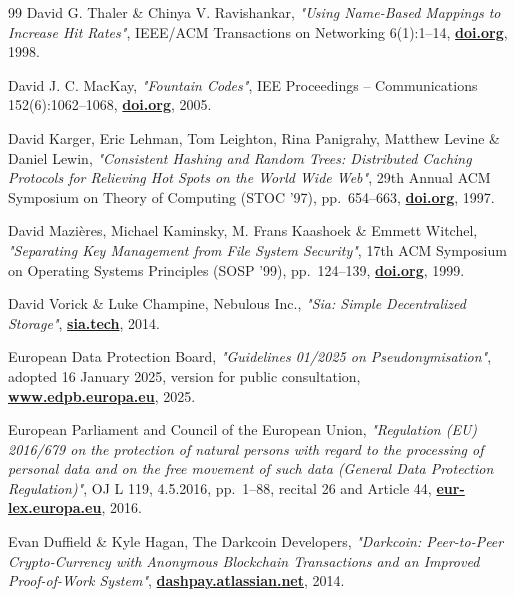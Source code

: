 \documentclass[10pt,a4paper,final]{article}
\let\oldhref\href
\renewcommand{\href}[2]{\oldhref{#1}{\bfseries#2}}
\begin{document}
\begin{thebibliography}{99}
	David G. Thaler \& Chinya V. Ravishankar,
	\emph{"Using Name-Based Mappings to Increase Hit Rates"},
	IEEE/ACM Transactions on Networking 6(1):1--14,
	\href{https://doi.org/10.1109/90.663936}{doi.org},
	1998.

	David J. C. MacKay,
	\emph{"Fountain Codes"},
	IEE Proceedings -- Communications 152(6):1062--1068,
	\href{https://doi.org/10.1049/ip-com:20050237}{doi.org},
	2005.

	David Karger, Eric Lehman, Tom Leighton, Rina Panigrahy, Matthew Levine \& Daniel Lewin,
	\emph{"Consistent Hashing and Random Trees: Distributed Caching Protocols for Relieving Hot Spots on the World Wide Web"},
	29th Annual ACM Symposium on Theory of Computing (STOC '97), pp.~654--663,
	\href{https://doi.org/10.1145/258533.258660}{doi.org},
	1997.

	David Mazi\`{e}res, Michael Kaminsky, M. Frans Kaashoek \& Emmett Witchel,
	\emph{"Separating Key Management from File System Security"},
	17th ACM Symposium on Operating Systems Principles (SOSP '99), pp.~124--139,
	\href{https://doi.org/10.1145/319151.319160}{doi.org},
	1999.

	David Vorick \& Luke Champine, Nebulous Inc.,
	\emph{"Sia: Simple Decentralized Storage"},
	\href{https://sia.tech/whitepaper.pdf}{sia.tech},
	2014.

	European Data Protection Board,
	\emph{"Guidelines 01/2025 on Pseudonymisation"},
	adopted 16 January 2025, version for public consultation,
	\href{https://www.edpb.europa.eu/system/files/2025-01/edpb_guidelines_202501_pseudonymisation_en.pdf}{www.edpb.europa.eu},
	2025.

	European Parliament and Council of the European Union,
	\emph{"Regulation (EU) 2016/679 on the protection of natural persons with regard to the processing of personal
	data and on the free movement of such data (General Data Protection Regulation)"},
	OJ L 119, 4.5.2016, pp.~1--88, recital 26 and Article 44,
	\href{https://eur-lex.europa.eu/eli/reg/2016/679/oj}{eur-lex.europa.eu},
	2016.

	Evan Duffield \& Kyle Hagan, The Darkcoin Developers,
	\emph{"Darkcoin: Peer-to-Peer Crypto-Currency with Anonymous Blockchain Transactions and an Improved Proof-of-Work System"},
	\href{https://dashpay.atlassian.net/wiki/download/attachments/132120878/Darkcoin\%20Whitepaper.pdf}{dashpay.atlassian.net},
	2014.


\end{thebibliography}
\end{document}
